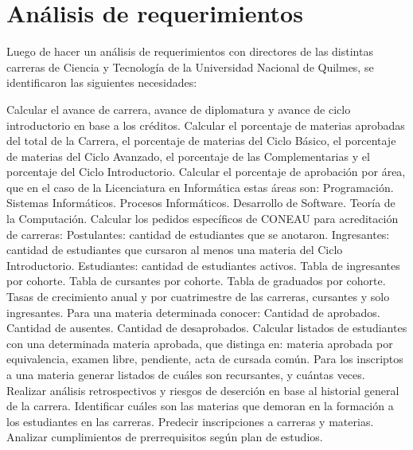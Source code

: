\section[Análisis de requerimientos]{Análisis de requerimientos}

Luego de hacer un análisis de requerimientos con directores de las distintas carreras de Ciencia y Tecnología de la Universidad Nacional de Quilmes, se identificaron las siguientes necesidades:

\begin{outline}
    \1 Calcular el avance de carrera, avance de diplomatura y avance de ciclo introductorio en base a los créditos.
    \1 Calcular el porcentaje de materias aprobadas del total de la Carrera, el porcentaje de materias del Ciclo Básico, el porcentaje de materias del Ciclo Avanzado, el porcentaje de las Complementarias y el porcentaje del Ciclo Introductorio.
    \1 Calcular el porcentaje de aprobación por área, que en el caso de la Licenciatura en Informática estas áreas son: 
        \2 Programación.
        \2 Sistemas Informáticos.
        \2 Procesos Informáticos.
        \2 Desarrollo de Software.
        \2 Teoría de la Computación.
    \1 Calcular los pedidos específicos de CONEAU para acreditación de carreras:
        \2 Postulantes: cantidad de estudiantes que se anotaron.
        \2 Ingresantes: cantidad de estudiantes que cursaron al menos una materia del Ciclo Introductorio.
        \2 Estudiantes: cantidad de estudiantes activos.
        \2 Tabla de ingresantes por cohorte.
        \2 Tabla de cursantes por cohorte.
        \2 Tabla de graduados por cohorte.
        \2 Tasas de crecimiento anual y por cuatrimestre de las carreras, cursantes y solo ingresantes.
    \1 Para una materia determinada conocer:
        \2 Cantidad de aprobados.
        \2 Cantidad de ausentes.
        \2 Cantidad de desaprobados.
    \1 Calcular listados de estudiantes con una determinada materia aprobada, que distinga en: materia aprobada por equivalencia, examen libre, pendiente, acta de cursada común.
    \1 Para los inscriptos a una materia generar listados de cuáles son recursantes, y cuántas veces.
    \1 Realizar análisis retrospectivos y riesgos de deserción en base al historial general de la carrera.
    \1 Identificar cuáles son las materias que demoran en la formación a los estudiantes en las carreras. 
    \1 Predecir inscripciones a carreras y materias.
    \1 Analizar cumplimientos de prerrequisitos según plan de estudios.
        
\end{outline}


